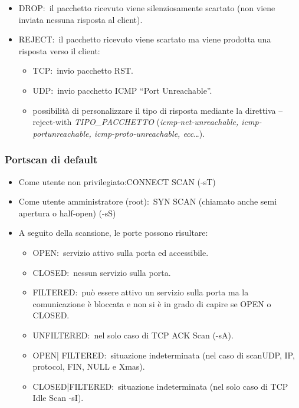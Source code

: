 \begin{itemize}
    \item DROP:\ il pacchetto ricevuto viene silenziosamente scartato (non viene inviata nessuna risposta al client).
    \item REJECT:\ il pacchetto ricevuto viene scartato ma viene prodotta una risposta verso il client:
          \begin{itemize}
              \item TCP:\ invio pacchetto RST.
              \item UDP:\ invio pacchetto ICMP ``Port Unreachable''.
              \item possibilità di personalizzare il tipo di risposta mediante la direttiva --reject-with \emph{TIPO\_PACCHETTO} (\emph{icmp-net-unreachable, icmp-portunreachable, icmp-proto-unreachable, ecc}\dots).
          \end{itemize}
\end{itemize}

\subsubsection{Portscan di default}

\begin{itemize}
    \item Come utente non privilegiato:CONNECT SCAN (-sT)
    \item Come utente amministratore (root):\ SYN SCAN (chiamato anche semi apertura o half-open) (-sS)
    \item A seguito della scansione, le porte possono risultare:
          \begin{itemize}
              \item OPEN:\ servizio attivo sulla porta ed accessibile.
              \item CLOSED:\ nessun servizio sulla porta.
              \item FILTERED:\ può essere attivo un servizio sulla porta ma la comunicazione è bloccata e non si è in grado di capire se OPEN o CLOSED.
              \item UNFILTERED:\ nel solo caso di TCP ACK Scan (-sA).
              \item OPEN| FILTERED:\ situazione indeterminata (nel caso di scanUDP, IP, protocol, FIN, NULL e Xmas).
              \item CLOSED|FILTERED:\ situazione indeterminata (nel solo caso di TCP Idle Scan -sI).
          \end{itemize}
\end{itemize}

